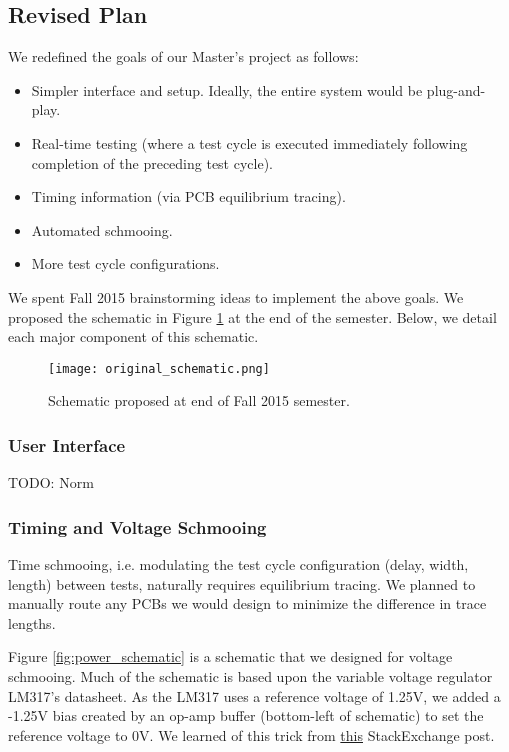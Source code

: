 \subsection{Revised Plan}
We redefined the goals of our Master's project as follows: 
\begin{itemize}
\item Simpler interface and setup. Ideally, the entire system would be plug-and-play.
\item Real-time testing (where a test cycle is executed immediately following completion of the preceding test cycle).
\item Timing information (via PCB equilibrium tracing).
\item Automated schmooing.
\item More test cycle configurations.
\end{itemize}

We spent Fall 2015 brainstorming ideas to implement the above goals. We proposed the schematic in Figure \ref{fig:f15_schematic} at the end of the semester. Below, we detail each major component of this schematic.

\begin{figure}
\texttt{[image: original\_schematic.png]}
\caption{Schematic proposed at end of Fall 2015 semester.}
\label{fig:f15_schematic}
\end{figure}

\subsubsection{User Interface}
TODO: Norm

\subsubsection{Timing and Voltage Schmooing}
Time schmooing, i.e. modulating the test cycle configuration (delay, width, length) between tests, naturally requires equilibrium tracing. We planned to manually route any PCBs we would design to minimize the difference in trace lengths.

Figure \ref{fig:power_schematic} is a schematic that we designed for voltage schmooing. Much of the schematic is based upon the variable voltage regulator LM317's datasheet. As the LM317 uses a reference voltage of 1.25V, we added a -1.25V bias created by an op-amp buffer (bottom-left of schematic) to set the reference voltage to 0V. We learned of this trick from  \href{http://electronics.stackexchange.com/questions/186760/why-do-linear-voltage-regulators-have-minimum-output-voltage-0-v}{this} StackExchange post. 

